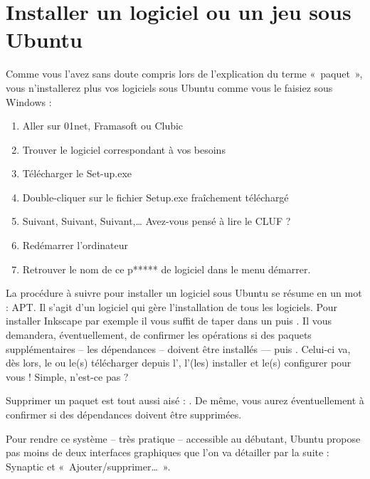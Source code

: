 {\section{Installer un logiciel ou un jeu sous Ubuntu}
\label{RefInstallApp}
Comme vous l'avez sans doute compris lors de l'explication du terme «~paquet~», vous n'installerez plus vos logiciels sous Ubuntu comme vous le faisiez sous Windows :\par
\begin{enumerate}
\item Aller sur 01net, Framasoft ou Clubic
\item Trouver le logiciel correspondant à vos besoins
\item Télécharger le Set-up.exe
\item Double-cliquer sur le fichier Setup.exe fraîchement téléchargé
\item Suivant, Suivant, Suivant,\ldots{} Avez-vous pensé à lire le CLUF ?
\item Redémarrer l'ordinateur
\item Retrouver le nom de ce p***** de logiciel dans le menu démarrer.
\end{enumerate}
La procédure à suivre pour installer un logiciel sous Ubuntu se résume en un mot : APT. Il s'agit d'un logiciel qui gère l'installation de tous les logiciels. Pour installer Inkscape par exemple il vous suffit de taper  dans un  puis . Il vous demandera, éventuellement, de confirmer les opérations si des paquets supplémentaires -- les dépendances -- doivent être installés ---  puis . Celui-ci va, dès lors, le ou le(s) télécharger depuis l', l'(les) installer et le(s) configurer pour vous ! Simple, n'est-ce pas ?\par
Supprimer un paquet est tout aussi aisé :  . De même, vous aurez éventuellement à confirmer si des dépendances doivent être supprimées.\par
Pour rendre ce système -- très pratique -- accessible au débutant, Ubuntu propose pas moins de deux interfaces graphiques que l'on va détailler par la suite : Synaptic et «~Ajouter/supprimer\ldots{}~».
}

